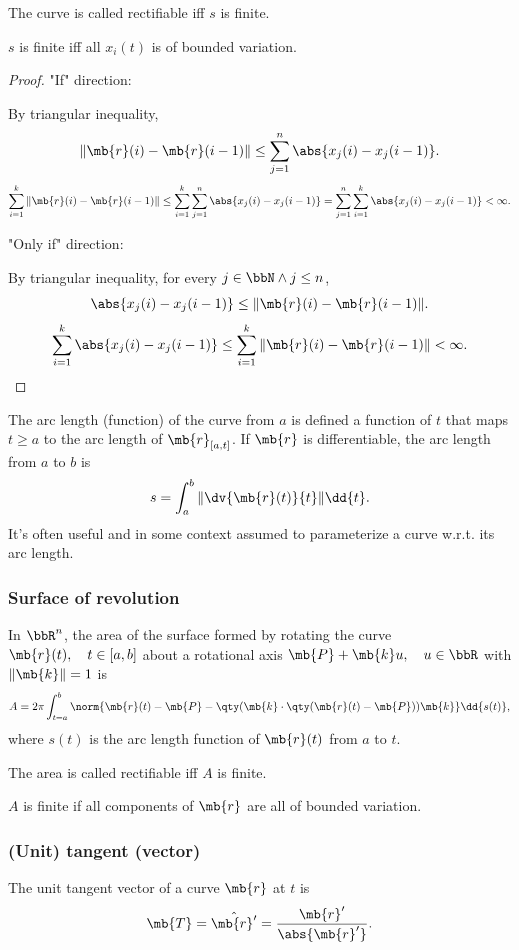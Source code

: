 \documentclass[a4paper,12pt]{article}
\begin{document}
The curve is called rectifiable iff $s$ is finite.

$s$ is finite iff all $x_i(t)$ is of bounded variation.
\begin{proof}
"If" direction:

By triangular inequality,
\[\|\mb{r}(i)-\mb{r}(i-1)\|\leq\sum_{j=1}^n\abs{x_j(i)-x_j(i-1)}.\]
\[\sum_{i=1}^k\|\mb{r}(i)-\mb{r}(i-1)\|\leq\sum_{i=1}^k\sum_{j=1}^n\abs{x_j(i)-x_j(i-1)}=\sum_{j=1}^n\sum_{i=1}^k\abs{x_j(i)-x_j(i-1)}<\infty.\]

"Only if" direction:

By triangular inequality, for every $j\in\bbN\land j\leq n$,
\[\abs{x_j(i)-x_j(i-1)}\leq\|\mb{r}(i)-\mb{r}(i-1)\|.\]
\[\sum_{i=1}^k\abs{x_j(i)-x_j(i-1)}\leq\sum_{i=1}^k\|\mb{r}(i)-\mb{r}(i-1)\|<\infty.\]
\end{proof}

The arc length (function) of the curve from $a$ is defined a function of $t$ that maps $t\geq a$ to the arc length of $\mb{r}_{[a,t]}$.
If $\mb{r}$ is differentiable, the arc length from $a$ to $b$ is
\[s=\int_a^b\|\dv{\mb{r}(t)}{t}\|\dd{t}.\]
It's often useful and in some context assumed to parameterize a curve w.r.t. its arc length.
\subsubsection{Surface of revolution}
In $\bbR^n$, the area of the surface formed by rotating the curve $\mb{r}(t),\quad t\in[a,b]$ about a rotational axis $\mb{P}+\mb{k}u,\quad u\in\bbR$ with $\|\mb{k}\|=1$ is
\[A=2\pi\int_{t=a}^b\norm{\mb{r}(t)-\mb{P}-\qty(\mb{k}\cdot\qty(\mb{r}(t)-\mb{P}))\mb{k}}\dd{s(t)},\]
where $s(t)$ is the arc length function of $\mb{r}(t)$ from $a$ to $t$.

The area is called rectifiable iff $A$ is finite.

$A$ is finite if all components of $\mb{r}$ are all of bounded variation.
\subsubsection{(Unit) tangent (vector)}
The unit tangent vector of a curve $\mb{r}$ at $t$ is
\[\mb{T}=\hat{\mb{r}'}=\frac{\mb{r}'}{\abs{\mb{r}'}}.\]
\end{document}
